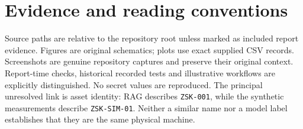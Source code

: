 \documentclass[a4paper,11pt,oneside]{report}
\begin{document}
\tableofcontents
\vfill\section*{Evidence and reading conventions}
Source paths are relative to the repository root unless marked as included report evidence. Figures are original schematics; plots use exact supplied CSV records. Screenshots are genuine repository captures and preserve their original context. Report-time checks, historical recorded tests and illustrative workflows are explicitly distinguished. No secret values are reproduced.
\smallskip
The principal unresolved link is asset identity: RAG describes \texttt{ZSK-001}, while the synthetic measurements describe \texttt{ZSK-SIM-01}. Neither a similar name nor a model label establishes that they are the same physical machine.

\clearpage

\clearpage

\clearpage

\clearpage

\clearpage

\clearpage

\clearpage

\clearpage

\clearpage

\clearpage

\clearpage

\clearpage

\clearpage

\clearpage

\clearpage

\clearpage

\clearpage

\clearpage

\clearpage

\clearpage

\clearpage

\clearpage

\clearpage

\clearpage

\clearpage

\clearpage
\clearpage\renewcommand{\bibname}{References}\begingroup\small\setlength{\parskip}{2pt}\endgroup
\end{document}

